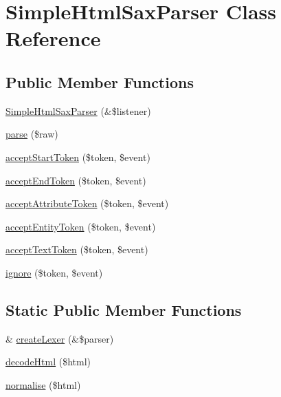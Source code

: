 \hypertarget{class_simple_html_sax_parser}{
\section{SimpleHtmlSaxParser Class Reference}
\label{class_simple_html_sax_parser}
}
\subsection*{Public Member Functions}
\begin{DoxyCompactItemize}
\item 
\hyperlink{class_simple_html_sax_parser_a1370090e97f034ef38839a4569d740d8}{SimpleHtmlSaxParser} (\&\$listener)
\item 
\hyperlink{class_simple_html_sax_parser_a2f2715ca4673bae15a7c8a53d253a083}{parse} (\$raw)
\item 
\hyperlink{class_simple_html_sax_parser_a904741fe61cc7283c9f79d55ffcc4093}{acceptStartToken} (\$token, \$event)
\item 
\hyperlink{class_simple_html_sax_parser_a3f7e6bfe6467157a454c508770f7a91c}{acceptEndToken} (\$token, \$event)
\item 
\hyperlink{class_simple_html_sax_parser_a7a7c562dc219fe6471d41779878ab75b}{acceptAttributeToken} (\$token, \$event)
\item 
\hyperlink{class_simple_html_sax_parser_a64e03cc7d6ee88bf887fc835271f7520}{acceptEntityToken} (\$token, \$event)
\item 
\hyperlink{class_simple_html_sax_parser_a265f53b3f267aad0afd1ce50bd7633ad}{acceptTextToken} (\$token, \$event)
\item 
\hyperlink{class_simple_html_sax_parser_a2f1f52f6ef26043cb8bef7ab0e62dc7c}{ignore} (\$token, \$event)
\end{DoxyCompactItemize}
\subsection*{Static Public Member Functions}
\begin{DoxyCompactItemize}
\item 
\& \hyperlink{class_simple_html_sax_parser_a0c7fea7ce76c8d91d167f0b7c6f6b91d}{createLexer} (\&\$parser)
\item 
\hyperlink{class_simple_html_sax_parser_afbd8c1c10a2b76270fabf7358340b58d}{decodeHtml} (\$html)
\item 
\hyperlink{class_simple_html_sax_parser_a54592509563906bedbd10520269d3ec9}{normalise} (\$html)
\end{DoxyCompactItemize}
